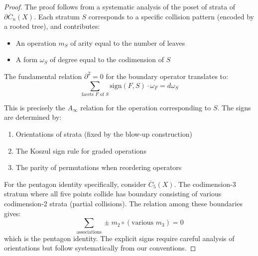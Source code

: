 \begin{proof}
The proof follows from a systematic analysis of the poset of strata of $\partial\overline{C}_n(X)$. 
Each stratum $S$ corresponds to a specific collision pattern (encoded by a rooted tree), and contributes:
\begin{itemize}
\item An operation $m_S$ of arity equal to the number of leaves
\item A form $\omega_S$ of degree equal to the codimension of $S$
\end{itemize}
 
The fundamental relation $\partial^2 = 0$ for the boundary operator translates to:
\[
\sum_{\text{facets } F \text{ of } S} \text{sign}(F,S) \cdot \omega_F = d\omega_S
\]
 
This is precisely the $A_\infty$ relation for the operation corresponding to $S$. The signs are 
determined by:
\begin{enumerate}
\item Orientations of strata (fixed by the blow-up construction)
\item The Koszul sign rule for graded operations
\item The parity of permutations when reordering operators
\end{enumerate}
 
For the pentagon identity specifically, consider $\overline{C}_5(X)$. The codimension-3 stratum where all 
five points collide has boundary consisting of various codimension-2 strata (partial collisions). The 
relation among these boundaries gives:
\[
\sum_{\text{associations}} \pm m_2 \circ (\text{various } m_3) = 0
\]
which is the pentagon identity. The explicit signs require careful analysis of orientations but follow 
systematically from our conventions.
\end{proof}
 
